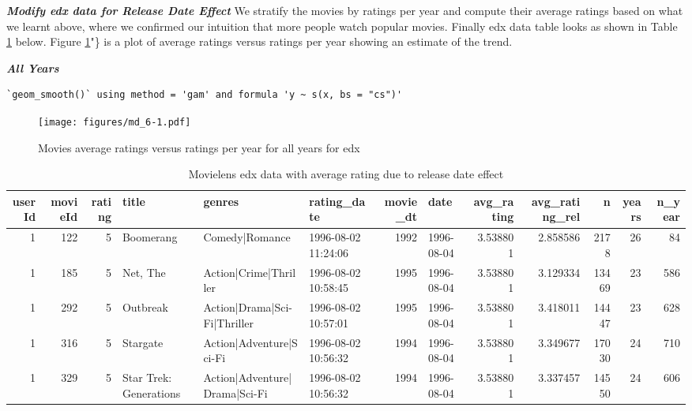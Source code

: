 \documentclass[
]{article}
\begin{document}
\newpage

\textbf{\emph{Modify edx data for Release Date Effect}} We stratify the
movies by ratings per year and compute their average ratings based on
what we learnt above, where we confirmed our intuition that more people
watch popular movies. Finally edx data table looks as shown in Table
\ref{tbl:movielens_edx_avg_release_date_effect} below. Figure
\ref{fig:movies_average_ratings_versus_ratings_per_year_for_all_years_for_edx}"\}
is a plot of average ratings versus ratings per year showing an estimate
of the trend.

\textbf{\emph{All Years}}

\begin{verbatim}
`geom_smooth()` using method = 'gam' and formula 'y ~ s(x, bs = "cs")'
\end{verbatim}

\begin{figure}
\centering
\texttt{[image: figures/md\_6-1.pdf]}
\caption{Movies average ratings versus ratings per year for all years
for
edx\label{fig:movies_average_ratings_versus_ratings_per_year_for_all_years_for_edx}}
\end{figure}

\begin{table}[H]

\caption{\label{tab:md_7}Movielens edx data with average rating due to release date effect\label{tbl:movielens_edx_avg_release_date_effect}}
\centering
\fontsize{4}{6}\selectfont
\begin{tabular}[t]{rrrlllrlrrrrr}
\toprule
userId & movieId & rating & title & genres & rating\_date & movie\_dt & date & avg\_rating & avg\_rating\_rel & n & years & n\_year\\
\midrule
1 & 122 & 5 & Boomerang & Comedy|Romance & 1996-08-02 11:24:06 & 1992 & 1996-08-04 & 3.538801 & 2.858586 & 2178 & 26 & 84\\
1 & 185 & 5 & Net, The & Action|Crime|Thriller & 1996-08-02 10:58:45 & 1995 & 1996-08-04 & 3.538801 & 3.129334 & 13469 & 23 & 586\\
1 & 292 & 5 & Outbreak & Action|Drama|Sci-Fi|Thriller & 1996-08-02 10:57:01 & 1995 & 1996-08-04 & 3.538801 & 3.418011 & 14447 & 23 & 628\\
1 & 316 & 5 & Stargate & Action|Adventure|Sci-Fi & 1996-08-02 10:56:32 & 1994 & 1996-08-04 & 3.538801 & 3.349677 & 17030 & 24 & 710\\
1 & 329 & 5 & Star Trek: Generations & Action|Adventure|Drama|Sci-Fi & 1996-08-02 10:56:32 & 1994 & 1996-08-04 & 3.538801 & 3.337457 & 14550 & 24 & 606\\
\bottomrule
\end{tabular}
\end{table}
\end{document}

